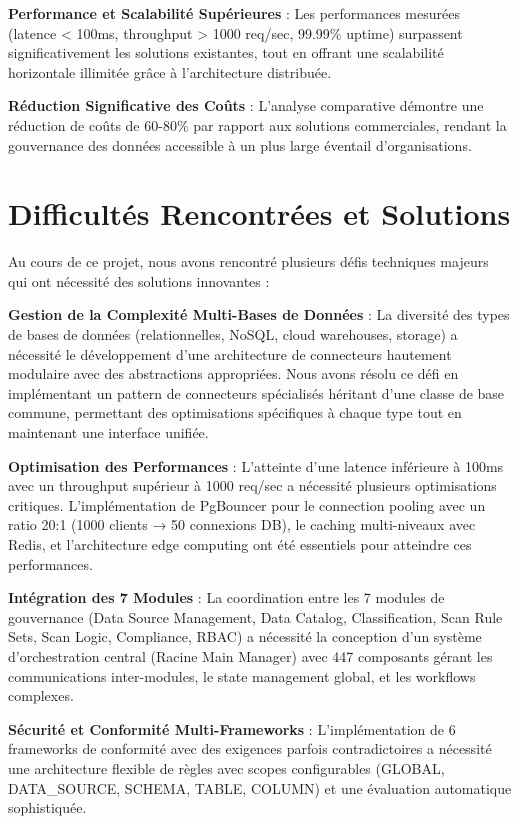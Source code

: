\textbf{Performance et Scalabilité Supérieures} : Les performances mesurées (latence < 100ms, throughput > 1000 req/sec, 99.99\% uptime) surpassent significativement les solutions existantes, tout en offrant une scalabilité horizontale illimitée grâce à l'architecture distribuée.

\textbf{Réduction Significative des Coûts} : L'analyse comparative démontre une réduction de coûts de 60-80\% par rapport aux solutions commerciales, rendant la gouvernance des données accessible à un plus large éventail d'organisations.

\section*{Difficultés Rencontrées et Solutions}

Au cours de ce projet, nous avons rencontré plusieurs défis techniques majeurs qui ont nécessité des solutions innovantes :

\textbf{Gestion de la Complexité Multi-Bases de Données} : La diversité des types de bases de données (relationnelles, NoSQL, cloud warehouses, storage) a nécessité le développement d'une architecture de connecteurs hautement modulaire avec des abstractions appropriées. Nous avons résolu ce défi en implémentant un pattern de connecteurs spécialisés héritant d'une classe de base commune, permettant des optimisations spécifiques à chaque type tout en maintenant une interface unifiée.

\textbf{Optimisation des Performances} : L'atteinte d'une latence inférieure à 100ms avec un throughput supérieur à 1000 req/sec a nécessité plusieurs optimisations critiques. L'implémentation de PgBouncer pour le connection pooling avec un ratio 20:1 (1000 clients → 50 connexions DB), le caching multi-niveaux avec Redis, et l'architecture edge computing ont été essentiels pour atteindre ces performances.

\textbf{Intégration des 7 Modules} : La coordination entre les 7 modules de gouvernance (Data Source Management, Data Catalog, Classification, Scan Rule Sets, Scan Logic, Compliance, RBAC) a nécessité la conception d'un système d'orchestration central (Racine Main Manager) avec 447 composants gérant les communications inter-modules, le state management global, et les workflows complexes.

\textbf{Sécurité et Conformité Multi-Frameworks} : L'implémentation de 6 frameworks de conformité avec des exigences parfois contradictoires a nécessité une architecture flexible de règles avec scopes configurables (GLOBAL, DATA\_SOURCE, SCHEMA, TABLE, COLUMN) et une évaluation automatique sophistiquée.

